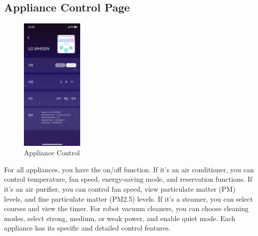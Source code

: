 \documentclass[conference]{IEEEtran}
\begin{document}
    \subsection{Appliance Control Page}
        \begin{figure}[htbp]
            \centerline{\includegraphics[width=3cm]{Images/screen/elec/8_ELEC_SETTING.PNG}}
            \caption{Appliance Control}
            \label{fig}
        \end{figure}
        For all appliances, you have the on/off function. If it's an air conditioner, you can control temperature, fan speed, energy-saving mode, and reservation functions. If it's an air purifier, you can control fan speed, view particulate matter (PM) levels, and fine particulate matter (PM2.5) levels. If it's a steamer, you can select courses and view the timer. For robot vacuum cleaners, you can choose cleaning modes, select strong, medium, or weak power, and enable quiet mode. Each appliance has its specific and detailed control features.
\end{document}

